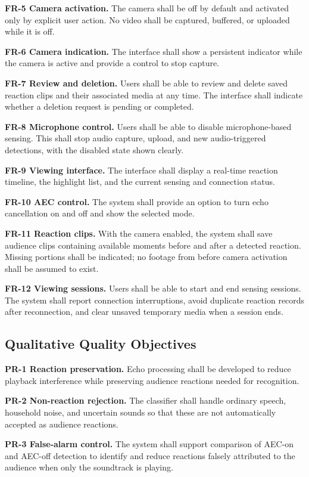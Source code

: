 \textbf{FR-5 Camera activation.} The camera shall be off by default and activated only by explicit user action. No video shall be captured, buffered, or uploaded while it is off.

\textbf{FR-6 Camera indication.} The interface shall show a persistent indicator while the camera is active and provide a control to stop capture.

\textbf{FR-7 Review and deletion.} Users shall be able to review and delete saved reaction clips and their associated media at any time. The interface shall indicate whether a deletion request is pending or completed.

\textbf{FR-8 Microphone control.} Users shall be able to disable microphone-based sensing. This shall stop audio capture, upload, and new audio-triggered detections, with the disabled state shown clearly.

\textbf{FR-9 Viewing interface.} The interface shall display a real-time reaction timeline, the highlight list, and the current sensing and connection status.

\textbf{FR-10 AEC control.} The system shall provide an option to turn echo cancellation on and off and show the selected mode.

\textbf{FR-11 Reaction clips.} With the camera enabled, the system shall save audience clips containing available moments before and after a detected reaction. Missing portions shall be indicated; no footage from before camera activation shall be assumed to exist.

\textbf{FR-12 Viewing sessions.} Users shall be able to start and end sensing sessions. The system shall report connection interruptions, avoid duplicate reaction records after reconnection, and clear unsaved temporary media when a session ends.

\subsection{Qualitative Quality Objectives}

\textbf{PR-1 Reaction preservation.} Echo processing shall be developed to reduce playback interference while preserving audience reactions needed for recognition.

\textbf{PR-2 Non-reaction rejection.} The classifier shall handle ordinary speech, household noise, and uncertain sounds so that these are not automatically accepted as audience reactions.

\textbf{PR-3 False-alarm control.} The system shall support comparison of AEC-on and AEC-off detection to identify and reduce reactions falsely attributed to the audience when only the soundtrack is playing.

